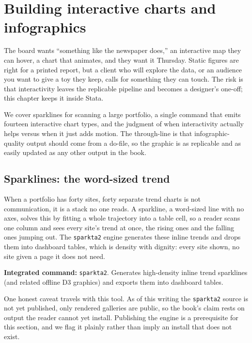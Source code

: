 \documentclass[
    a4paper,
    fontsize=10pt,
    twoside=true,
    numbers=noenddot,
]{kaobook}
\begin{document}
\chapter{Building interactive charts and infographics}\label{ch:interactive}

The board wants \enquote{something like the newspaper does,} an interactive map they can hover, a chart that animates, and they want it Thursday. Static figures are right for a printed report, but a client who will explore the data, or an audience you want to give a toy they keep, calls for something they can touch. The risk is that interactivity leaves the replicable pipeline and becomes a designer's one-off; this chapter keeps it inside Stata.

We cover sparklines for scanning a large portfolio, a single command that emits fourteen interactive chart types, and the judgment of when interactivity actually helps versus when it just adds motion. The through-line is that infographic-quality output should come from a do-file, so the graphic is as replicable and as easily updated as any other output in the book.

\section{Sparklines: the word-sized trend}
When a portfolio has forty sites, forty separate trend charts is not communication, it is a stack no one reads. A sparkline, a word-sized line with no axes, solves this by fitting a whole trajectory into a table cell, so a reader scans one column and sees every site's trend at once, the rising ones and the falling ones jumping out. The \texttt{sparkta2} engine generates these inline trends and drops them into dashboard tables, which is density with dignity: every site shown, no site given a page it does not need.

\begin{kaobox}[frametitle=Package Integration: \texttt{sparkta2}]
\textbf{Integrated command:} \texttt{sparkta2}. Generates high-density inline trend sparklines (and related offline D3 graphics) and exports them into dashboard tables. %
\end{kaobox}

One honest caveat travels with this tool. As of this writing the \texttt{sparkta2} source is not yet published, only rendered galleries are public, so the book's claim rests on output the reader cannot yet install. Publishing the engine is a prerequisite for this section, and we flag it plainly rather than imply an install that does not exist.
\end{document}
